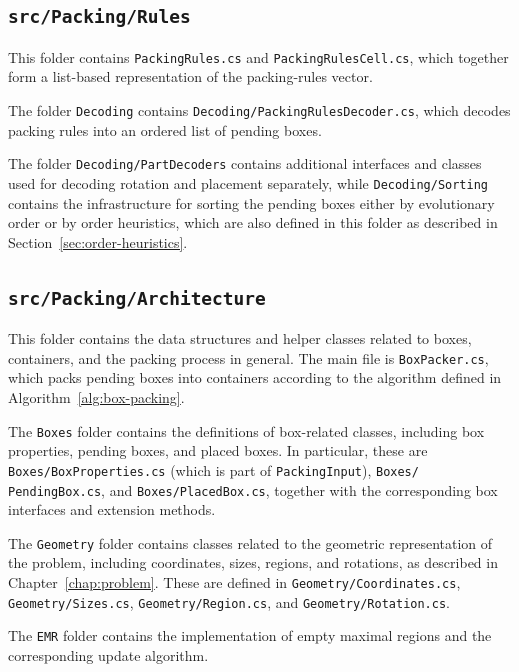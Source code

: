 \subsection{\texttt{src/Packing/Rules}}

This folder contains \texttt{PackingRules.cs} and \texttt{PackingRulesCell.cs},
which together form a list-based representation of the packing-rules vector.

The folder \texttt{Decoding} contains \texttt{Decoding/PackingRulesDecoder.cs},
which decodes packing rules into an ordered list of pending boxes.

The folder \texttt{Decoding/PartDecoders} contains additional interfaces and classes used for decoding
rotation and placement separately, while \texttt{Decoding/Sorting} contains the infrastructure
for sorting the pending boxes either by evolutionary order or by order heuristics, which are also defined in this folder
as described in Section~\ref{sec:order-heuristics}.

\subsection{\texttt{src/Packing/Architecture}}

This folder contains the data structures and helper classes related to boxes, containers, and the packing process in general. 
The main file is \texttt{BoxPacker.cs}, which packs pending boxes into containers according to the algorithm defined in Algorithm~\ref{alg:box-packing}.

The \texttt{Boxes} folder contains the definitions of box-related classes, including box properties, pending boxes, and placed boxes. 
In particular, these are \texttt{Boxes/BoxProperties.cs} (which is part of \texttt{PackingInput}), 
\texttt{Boxes/\\PendingBox.cs}, and \texttt{Boxes/PlacedBox.cs}, together with the corresponding box interfaces and extension methods.

The \texttt{Geometry} folder contains classes related to the geometric representation of the problem, including coordinates, sizes, regions, and rotations, as described in Chapter~\ref{chap:problem}. 
These are defined in \texttt{Geometry/Coordinates.cs}, \texttt{Geometry/\allowbreak Sizes.cs}, \texttt{Geometry/Region.cs}, and \texttt{Geometry/Rotation.cs}.

The \texttt{EMR} folder contains the implementation of empty maximal regions and the corresponding update algorithm.

